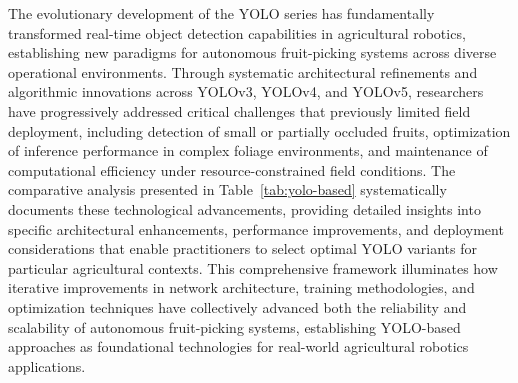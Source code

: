 \documentclass{ieeeaccess}
\begin{document}
The evolutionary development of the YOLO series has fundamentally transformed real-time object detection capabilities in agricultural robotics, establishing new paradigms for autonomous fruit-picking systems across diverse operational environments. Through systematic architectural refinements and algorithmic innovations across YOLOv3, YOLOv4, and YOLOv5, researchers have progressively addressed critical challenges that previously limited field deployment, including detection of small or partially occluded fruits, optimization of inference performance in complex foliage environments, and maintenance of computational efficiency under resource-constrained field conditions. The comparative analysis presented in Table~\ref{tab:yolo-based} systematically documents these technological advancements, providing detailed insights into specific architectural enhancements, performance improvements, and deployment considerations that enable practitioners to select optimal YOLO variants for particular agricultural contexts. This comprehensive framework illuminates how iterative improvements in network architecture, training methodologies, and optimization techniques have collectively advanced both the reliability and scalability of autonomous fruit-picking systems, establishing YOLO-based approaches as foundational technologies for real-world agricultural robotics applications.
\end{document}
